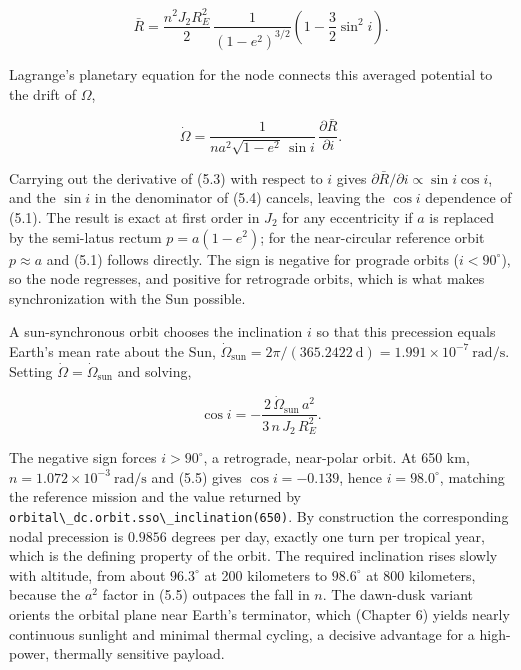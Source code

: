 \documentclass[
  11pt,
  openany,
  oneside]{book}
\newcommand{\passthrough}[1]{#1}
\begin{document}
\begin{equation}
\bar R = \frac{n^2 J_2 R_E^2}{2}\,\frac{1}{(1-e^2)^{3/2}}
\left(1 - \frac{3}{2}\sin^2 i\right). \tag{5.3}
\end{equation}

Lagrange's planetary equation for the node connects this averaged
potential to the drift of \(\Omega\),

\begin{equation}
\dot\Omega = \frac{1}{n a^2 \sqrt{1-e^2}\,\sin i}\,\frac{\partial \bar R}{\partial i}. \tag{5.4}
\end{equation}

Carrying out the derivative of (5.3) with respect to \(i\) gives
\(\partial\bar R/\partial i \propto \sin i\cos i\), and the \(\sin i\)
in the denominator of (5.4) cancels, leaving the \(\cos i\) dependence
of (5.1). The result is exact at first order in \(J_2\) for any
eccentricity if \(a\) is replaced by the semi-latus rectum
\(p = a(1-e^2)\); for the near-circular reference orbit \(p \approx a\)
and (5.1) follows directly. The sign is negative for prograde orbits
(\(i < 90^\circ\)), so the node regresses, and positive for retrograde
orbits, which is what makes synchronization with the Sun possible.

A sun-synchronous orbit chooses the inclination \(i\) so that this
precession equals Earth's mean rate about the Sun,
\(\dot\Omega_{\mathrm{sun}} = 2\pi / (365.2422\ \mathrm{d}) = 1.991\times10^{-7}\ \mathrm{rad/s}\).
Setting \(\dot\Omega = \dot\Omega_{\mathrm{sun}}\) and solving,

\begin{equation}
\cos i = -\frac{2\,\dot\Omega_{\mathrm{sun}}\, a^2}{3\, n\, J_2\, R_E^2}. \tag{5.5}
\end{equation}

The negative sign forces \(i > 90^\circ\), a retrograde, near-polar
orbit. At 650 km, \(n = 1.072\times10^{-3}\ \mathrm{rad/s}\) and (5.5)
gives \(\cos i = -0.139\), hence \(i = 98.0^\circ\), matching the
reference mission and the value returned by
\passthrough{\lstinline!orbital\_dc.orbit.sso\_inclination(650)!}. By
construction the corresponding nodal precession is \(0.9856\) degrees
per day, exactly one turn per tropical year, which is the defining
property of the orbit. The required inclination rises slowly with
altitude, from about \(96.3^\circ\) at 200 kilometers to \(98.6^\circ\)
at 800 kilometers, because the \(a^2\) factor in (5.5) outpaces the fall
in \(n\). The dawn-dusk variant orients the orbital plane near Earth's
terminator, which (Chapter 6) yields nearly continuous sunlight and
minimal thermal cycling, a decisive advantage for a high-power,
thermally sensitive payload.
\end{document}
